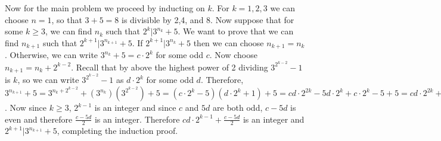 \documentclass[11pt]{article}
\begin{document}
\begin{enumerate}
Now for the main problem we proceed by inducting on $k$. For $k=1,2,3$ we can choose $n=1$, so that $3+5=8$ is divisible by 2,4, and 8. Now suppose that for some $k\ge 3$, we can find $n_k$ such that $2^k|3^{n_k}+5$. We want to prove that we can find $n_{k+1}$ such that $2^{k+1}|3^{n_{k+1}}+5.$ If $2^{k+1}|3^{n_k}+5$ then we can choose $n_{k+1}=n_k$. Otherwise, we can write $3^{n_k}+5=c\cdot 2^k$ for some odd $c$. Now choose $n_{k+1}=n_k+2^{k-2}$. Recall that by above the highest power of 2 dividing $3^{2^{k-2}}-1$ is $k$, so we can write $3^{2^{k-2}}-1$ as $d\cdot 2^k$ for some odd $d$. Therefore, $3^{n_{k+1}}+5=3^{n_k+2^{k-2}}+(3^{n_k})(3^{2^{k-2}})+5=(c\cdot 2^k-5)(d\cdot 2^k+1)+5=cd\cdot 2^{2k}-5d\cdot 2^k+c\cdot 2^k -5 +5 = cd\cdot 2^{2k}+(c-5d)\cdot 2^k = (2^{k+1})(cd\cdot 2^{k-1}+\frac{c-5d}{2})$. Now since $k\ge 3$, $2^{k-1}$ is an integer and since $c$ and $5d$ are both odd, $c-5d$ is even and therefore $\frac{c-5d}{2}$ is an integer. Therefore $cd\cdot 2^{k-1}+\frac{c-5d}{2}$ is an integer and $2^{k+1}|3^{n_{k+1}}+5$, completing the induction proof.
\end{enumerate}
\end{document}
